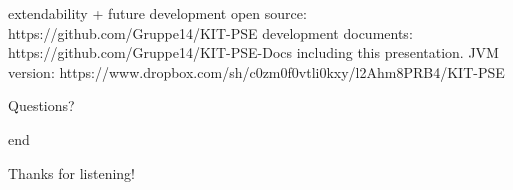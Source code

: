 \documentclass[xcolor=dvipsnames]{beamer}
\begin{document}
\begin{frame}{extendability + future development}
	open source: https://github.com/Gruppe14/KIT-PSE
	\newline development documents: https://github.com/Gruppe14/KIT-PSE-Docs
	\newline including this presentation.
	\newline
	\newline JVM version:
	\newline https://www.dropbox.com/sh/c0zm0f0vtli0kxy/l2Ahm8PRB4/KIT-PSE
\end{frame}

\begin{frame}{}
	\begin{center}
	\huge{Questions?}
	\end{center}
\end{frame}  

\begin{frame}{end}

\begin{center}
\huge{Thanks for listening!}
\end{center}


\end{frame}  


\end{document}
